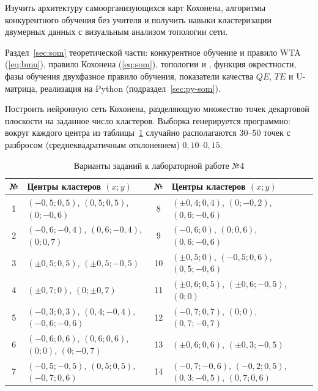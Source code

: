 
Изучить архитектуру самоорганизующихся карт Кохонена, алгоритмы конкурентного обучения без учителя и
получить навыки кластеризации двумерных данных с визуальным анализом топологии сети.

Раздел~\ref{sec:som} теоретической части: конкурентное обучение и правило WTA (\ref{eq:bmu}), правило
Кохонена (\ref{eq:som}), топологии  и , функция окрестности, фазы обучения
двухфазное правило обучения, показатели качества $QE$, $TE$ и U-матрица, реализация на Python
(подраздел~\ref{sec:py-som}).

Построить нейронную сеть Кохонена, разделяющую множество точек декартовой плоскости на заданное число
кластеров. Выборка генерируется программно: вокруг каждого центра из таблицы~\ref{tab:l4-var}
случайно располагаются 30--50 точек с разбросом (среднеквадратичным отклонением) $0,10$--$0,15$.

\begin{table}[!htb]
\caption{Варианты заданий к лабораторной работе №4}
\label{tab:l4-var}
\centering\small
\setlength{\tabcolsep}{4pt}
\begin{tabularx}{\textwidth}{c>{\raggedright}X|c>{\raggedright\arraybackslash}X}
\toprule
№ & Центры кластеров $(x; y)$ & № & Центры кластеров $(x; y)$ \\
\midrule
1 & $(-0,5; 0,5)$, $(0,5; 0,5)$, $(0; -0,6)$ & 8 & $(\pm 0,4; 0,4)$, $(0; -0,2)$, $(0,6; -0,6)$ \\
2 & $(-0,6; -0,4)$, $(0,6; -0,4)$, $(0; 0,7)$ & 9 & $(-0,6; 0)$, $(0; 0,6)$, $(0,6; -0,6)$ \\
3 & $(\pm 0,5; 0,5)$, $(\pm 0,5; -0,5)$ & 10 & $(\pm 0,5; 0)$, $(-0,5; 0,6)$, $(0,5; -0,6)$ \\
4 & $(\pm 0,7; 0)$, $(0; \pm 0,7)$ & 11 & $(\pm 0,6; 0,5)$, $(\pm 0,6; -0,5)$, $(0; 0)$ \\
5 & $(-0,3; 0,3)$, $(0,4; -0,4)$, $(-0,6; -0,6)$ & 12 & $(-0,7; 0,7)$, $(0; 0)$, $(0,7; -0,7)$ \\
6 & $(-0,6; 0,6)$, $(0,6; 0,6)$, $(0; 0)$, $(0; -0,7)$ & 13 & $(\pm 0,6; 0,6)$, $(\pm 0,3; -0,5)$ \\
7 & $(-0,5; -0,5)$, $(0,5; 0,5)$, $(-0,7; 0,6)$ & 14 & $(-0,7; -0,6)$, $(-0,2; 0,5)$, $(0,3; -0,5)$, $(0,7; 0,6)$ \\
\bottomrule
\end{tabularx}
\end{table}

